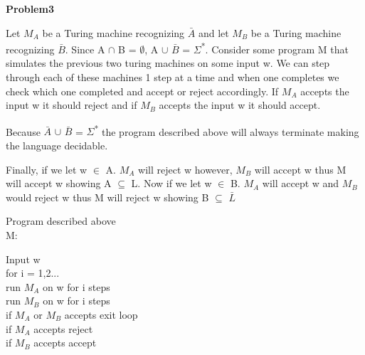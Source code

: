 \documentclass[12pt]{report}
\begin{document}
\textbf{Problem3}\\
\begin{addmargin}[1cm]{0em}
Let $M_A$ be a Turing machine recognizing $\bar{A}$ and let $M_B$ be a Turing machine recognizing $\bar{B}$. Since A $\cap$ B = $\emptyset$, A $\cup$ $\bar{B}$ = $\Sigma$\textsuperscript{*}.  Consider some program M that simulates the previous two turing machines on some input w.  We can step through each of these machines 1 step at a time and when one completes  we check which one completed and accept or reject accordingly. If $M_A$ accepts the input w it should reject and if $M_B$ accepts the input w it should accept.

Because $\bar{A}$ $\cup$ $\bar{B}$ = $\Sigma$\textsuperscript{*} the program described above will always terminate making the language decidable.

Finally, if we let w $\in$ A. $M_A$ will reject w however,  $M_B$ will accept w thus M will accept w showing A $\subseteq$ L.  Now if we let w $\in$ B. $M_A$ will accept w and $M_B$ would reject w thus M will reject w showing B $\subseteq$ $\bar{L}$

Program described above\\
M:
\begin{addmargin}[1cm]{0em}
	Input w\\
	\tab for i = 1,2...\\
	\tab\tab run $M_A$  on w for i steps\\
	\tab\tab run $M_B$  on w for i steps\\
	\tab\tab if $M_A$ or $M_B$ accepts exit loop\\
	\tab if $M_A$ accepts reject\\
	\tab if $M_B$ accepts accept\\

\end{addmargin}
\end{addmargin}
\end{document}
